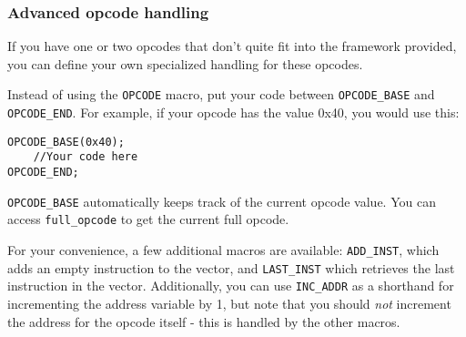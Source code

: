 \subsubsection{Advanced opcode handling}
If you have one or two opcodes that don't quite fit into the framework provided, you can define your own specialized handling for these opcodes.

Instead of using the \verb+OPCODE+ macro, put your code between \verb+OPCODE_BASE+ and \verb+OPCODE_END+. For example, if your opcode has the value 0x40, you would use this:

\begin{C++}
\begin{lstlisting}
OPCODE_BASE(0x40);
	//Your code here
OPCODE_END;
\end{lstlisting}
\end{C++}

\verb+OPCODE_BASE+ automatically keeps track of the current opcode value. You can access \verb+full_opcode+ to get the current full opcode.

For your convenience, a few additional macros are available: \verb+ADD_INST+, which adds an empty instruction to the vector, and \verb+LAST_INST+ which retrieves the last instruction in the vector. Additionally, you can use \verb+INC_ADDR+ as a shorthand for incrementing the address variable by 1, but note that you should \emph{not} increment the address for the opcode itself - this is handled by the other macros.
